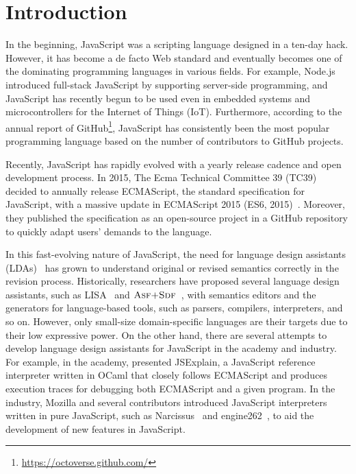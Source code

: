 \section{Introduction}\label{sec:intro}

In the beginning, JavaScript was a scripting language designed in a ten-day
hack. However, it has become a de facto Web standard and eventually becomes one
of the dominating programming languages in various fields. For example, Node.js
introduced full-stack JavaScript by supporting server-side programming, and
JavaScript has recently begun to be used even in embedded systems and
microcontrollers for the Internet of Things (IoT). Furthermore, according to the
annual report of GitHub\footnote{\url{https://octoverse.github.com/}},
JavaScript has consistently been the most popular programming language based on
the number of contributors to GitHub projects.

Recently, JavaScript has rapidly evolved with a yearly release cadence and open
development process. In 2015, The Ecma Technical Committee 39 (TC39) decided to
annually release ECMAScript, the standard specification for JavaScript, with a
massive update in ECMAScript 2015 (ES6, 2015)~\cite{es6}. Moreover, they
published the specification as an open-source project in a GitHub repository to
quickly adapt users' demands to the language.

In this fast-evolving nature of JavaScript, the need for language design
assistants (LDAs)~\cite{lda} has grown to understand original or revised
semantics correctly in the revision process. Historically, researchers have
proposed several language design assistants, such as LISA~\cite{lisa} and
$\textsc{Asf+Sdf}$~\cite{asf-sdf, meta-env}, with semantics editors and the generators
for language-based tools, such as parsers, compilers, interpreters, and so on.
However, only small-size domain-specific languages are their targets due to
their low expressive power. On the other hand, there are several attempts to
develop language design assistants for JavaScript in the academy and industry.
For example, in the academy, \citet{jsexplain} presented JSExplain, a JavaScript
reference interpreter written in OCaml that closely follows ECMAScript and
produces execution traces for debugging both ECMAScript and a given program. In
the industry, Mozilla and several contributors introduced JavaScript
interpreters written in pure JavaScript, such as Narcissus~\cite{narcissus} and
engine262~\cite{engine262}, to aid the development of new features in
JavaScript.

